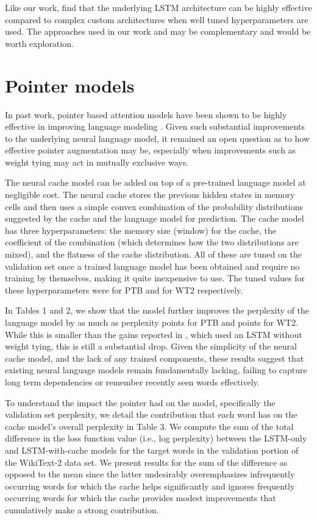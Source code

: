 \documentclass{article}
\begin{document}
Like our work, \citet{Melis2017} find that the underlying LSTM architecture can be highly effective compared to complex custom architectures when well tuned hyperparameters are used.
The approaches used in our work and \citet{Melis2017} may be complementary and would be worth exploration.

\section{Pointer models}

In past work, pointer based attention models have been shown to be highly effective in improving language modeling \citep{Merity2016,Grave2016}.
Given such substantial improvements to the underlying neural language model, it remained an open question as to how effective pointer augmentation may be, especially when improvements such as weight tying may act in mutually exclusive ways.

The neural cache model \citep{Grave2016} can be added on top of a pre-trained language model at negligible cost.
The neural cache stores the previous hidden states in memory cells and then uses a simple convex combination of the probability distributions suggested by the cache and the language model for prediction.
The cache model has three hyperparameters: the memory size (window) for the cache, the coefficient of the combination (which determines how the two distributions are mixed), and the flatness of the cache distribution.
All of these are tuned on the validation set once a trained language model has been obtained and require no training by themselves, making it quite inexpensive to use. The tuned values for these hyperparameters were  for PTB and  for WT2 respectively.

In Tables 1 and 2, we show that the model further improves the perplexity of the language model by as much as  perplexity points for PTB and  points for WT2.
While this is smaller than the gains reported in \citet{Grave2016}, which used an LSTM without weight tying, this is still a substantial drop.
Given the simplicity of the neural cache model, and the lack of any trained components, these results suggest that existing neural language models remain fundamentally lacking, failing to capture long term dependencies or remember recently seen words effectively.

To understand the impact the pointer had on the model, specifically the validation set perplexity, we detail the contribution that each word has on the cache model's overall perplexity in Table 3.
We compute the sum of the total difference in the loss function value (i.e., log perplexity) between the LSTM-only and LSTM-with-cache models for the target words in the validation portion of the WikiText-2 data set.
We present results for the sum of the difference as opposed to the mean since the latter undesirably overemphasizes infrequently occurring words for which the cache helps significantly and ignores frequently occurring words for which the cache provides modest improvements that cumulatively make a strong contribution.
\end{document}
